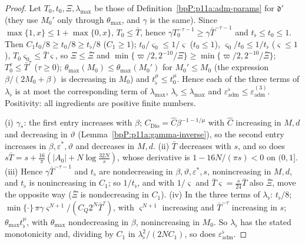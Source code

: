 \begin{proof}
\label{stepP:p11a:qb-comp} Let $T_0,t_0,\Xi,\lambda_{\max}$ be those of Definition~\ref{bpP:p11a:adm-params} for $\mathfrak d'$ (they use $M_0'$ only through $\theta_{\max}$, and $\gamma$ is the same). Since $\max\{1,x\}\le1+\max\{0,x\}$, $T_0\le\bar T$, hence $\gamma T_0^{-\tau-1}\ge\gamma\bar T^{-\tau-1}$ and $t_\flat\le t_0\le1$. Then $C_1t_0/8\ge t_0/8\ge t_\flat/8$ ($C_1\ge1$); $t_0/\varsigma_0\le1/\varsigma$ ($t_0\le1$), $\varsigma_0/t_0\le1/t_\flat$ ($\varsigma\le1$), $T_0\varsigma_0\le\bar T\varsigma$, so $\Xi\le\bar\Xi$ and $\min\{\varpi/2,2^{-10}/\Xi\}\ge\min\{\varpi/2,2^{-10}/\bar\Xi\}$; $T_0^\tau\le\bar T^\tau$ ($\tau\ge0$); $\theta_{\max}(M_0)\le\theta_{\max}(M_0')$ for $M_0'\le M_0$ (the expression $\beta/(2M_0+\beta)$ is decreasing in $M_0$) and $t_\flat^\mu\le t_0^\mu$. Hence each of the three terms of $\lambda_\flat$ is at most the corresponding term of $\lambda_{\max}$, $\lambda_\flat\le\lambda_{\max}$ and $\varepsilon^\flat_{\mathrm{adm}}\le\varepsilon^{(3)}_{\mathrm{adm}}$. Positivity: all ingredients are positive finite numbers.

\label{stepP:p11a:qb-mono} (i) $\gamma_*$: the first entry increases with $\beta$; $C_{\mathrm{Dio}}=\widehat C\beta^{-1-1/\mu}$ with $\widehat C$ increasing in $M,d$ and decreasing in $\vartheta$ (Lemma~\ref{bpP:p11a:gamma-inverse}), so the second entry increases in $\beta,\varepsilon^*,\vartheta$ and decreases in $M,d$. (ii) $\bar T$ decreases with $s$, and so does $s\bar T=s+\frac{16}\pi(\lvert A_0\rvert+N\log\frac{32N}s)$, whose derivative is $1-16N/(\pi s)<0$ on $(0,1]$. (iii) Hence $\gamma\bar T^{-\tau-1}$ and $t_\flat$ are nondecreasing in $\beta,\vartheta,\varepsilon^*,s$, nonincreasing in $M,d$, and $t_\flat$ is nonincreasing in $C_1$; so $1/t_\flat$, and with $1/\varsigma$ and $\bar T\varsigma=\frac s{24}\bar T$ also $\bar\Xi$, move the opposite way ($\bar\Xi$ is nondecreasing in $C_1$). (iv) In the three terms of $\lambda_\flat$: $t_\flat/8$; $\min\{\cdot\}\,\pi\gamma\varsigma^{N+1}/(C_Q2^N\bar T^\tau)$, with $\varsigma^{N+1}$ increasing and $\bar T^{-\tau}$ increasing in $s$; $\theta_{\max}t_\flat^\mu$, with $\theta_{\max}$ nondecreasing in $\beta$, nonincreasing in $M_0$. So $\lambda_\flat$ has the stated monotonicity and, dividing by $C_1$ in $\lambda_\flat^2/(2NC_1)$, so does $\varepsilon^\flat_{\mathrm{adm}}$.


\end{proof}
